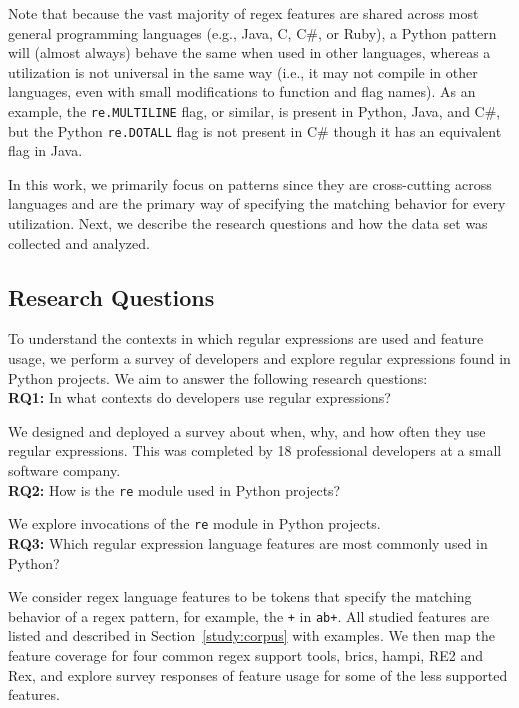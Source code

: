 Note that because the vast majority of regex features are shared across most general programming languages (e.g., Java, C, C\#, or Ruby), a Python {pattern} will (almost always) behave the same when used in other languages, whereas a utilization is not universal in the same way (i.e., it may not compile in other languages, even with small modifications to function and flag names).
As an example, the {\tt re.MULTILINE} flag, or similar, is present in Python, Java, and C\#, but  the Python {\tt re.DOTALL} flag is not present in C\# though it has an equivalent flag in Java.

In this work, we primarily focus on patterns since they are cross-cutting across languages and are the primary way of specifying the matching behavior for every utilization. Next, we describe the research questions and how the data set was collected and analyzed.

\subsection{Research Questions}
\label{sec:rqs}
To understand the contexts in which regular expressions are used  and feature usage, we perform a survey of developers and explore regular expressions found in Python projects. We aim to answer the following research questions:\\

\noindent \textbf{RQ1:} In what contexts do developers use regular expressions?

We designed and deployed a survey about when, why, and how often they use regular expressions. This was completed by 18 professional developers at a small software  company.\\

\noindent \textbf{RQ2:} How  is the {\tt re} module used in Python projects?

We explore invocations of  the {\tt re} module in  Python projects.\\


\noindent \textbf{RQ3:} Which regular expression language features are most commonly used in Python?

We consider regex language features to be tokens that specify the matching behavior of a regex pattern, for example,  the {\tt +} in {\tt ab+}.  All studied features are listed and described in Section~\ref{study:corpus} with examples. We then map the feature coverage for four common regex support tools, brics, hampi, RE2 and Rex, and explore survey responses of feature usage for some of the less supported features.\\

